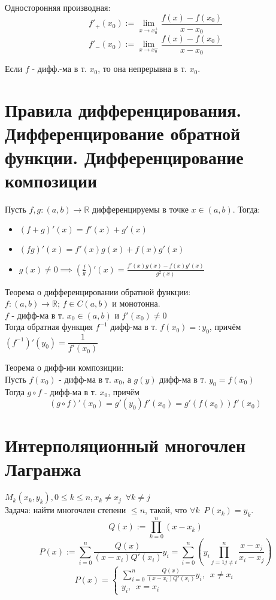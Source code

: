 \documentclass[11pt, a4paper]{article}
\def\R{\mathbb{R}}
\def\sp{\, \, \,}
\begin{document}
    Односторонняя производная:
    $$f'_+(x_0) := \lim_{x \to x_0^+} \frac{f(x) - f(x_0)}{x - x_0}$$
    $$f'_-(x_0) := \lim_{x \to x_0^-} \frac{f(x) - f(x_0)}{x - x_0}$$

    Если $f$ - дифф.-ма в т. $x_0$, то она непрерывна в т. $x_0$.

    \section{Правила дифференцирования. Дифференцирование обратной функции. Дифференцирование композиции}
    Пусть $f, g: (a,b) \to \R$ дифференцируемы в точке $x \in (a,b)$. Тогда:\\
    \begin{itemize}
        \item $(f+g)'(x) = f'(x) + g'(x)$
        \item $(fg)'(x) = f'(x)g(x) + f(x)g'(x)$
        \item $\displaystyle g(x) \neq 0 \implies \left(\frac{f}{g}\right)'(x) = \frac{f'(x)g(x) - f(x)g'(x)}{g^2(x)}$
    \end{itemize}

    Теорема о дифференцировании обратной функции:\\
    $f: (a,b) \to \R$; $f \in C(a,b)$ и монотонна.\\
    $f$ - дифф-ма в т. $x_0 \in (a,b)$ и $f'(x_0) \neq 0$\\
    Тогда обратная функция $f^{-1}$ дифф-ма в т. $f(x_0) =: y_0$, причём $(f^{-1})'(y_0) = \dfrac{1}{f'(x_0)}$

    Теорема о дифф-ии композиции:\\
    Пусть $f(x_0)$ - дифф-ма в т. $x_0$, а $g(y)$ дифф-ма в т. $y_0 = f(x_0)$\\
    Тогда $g \circ f$ - дифф-ма в т. $x_0$, причём
    $$(g \circ f)'(x_0) = g'(y_0)f'(x_0) = g'(f(x_0))f'(x_0)$$

    \section{Интерполяционный многочлен Лагранжа}
    $M_k(x_k, y_k), 0 \leq k \leq n, x_k \neq x_j \sp \forall k \neq j$\\
    Задача: найти многочлен степени $\leq n$, такой, что $\forall k \sp P(x_k) = y_k$.
    $$Q(x) := \prod_{k = 0}^n (x-x_k)$$
    $$P(x) := \sum_{i = 0}^{n} \frac{Q(x)}{(x-x_i)Q'(x_i)}y_i = \sum_{i = 0}^n \left(y_i \prod_{j = 1 j \neq i}^n \frac{x-x_j}{x_i-x_j}\right)$$
    $$P(x) = \begin{cases}
        \sum_{i = 0}^{n} \frac{Q(x)}{(x-x_i)Q'(x_i)}y_i, \sp x \neq x_i \\
        y_i, \sp x = x_i
    \end{cases}$$
\end{document}
